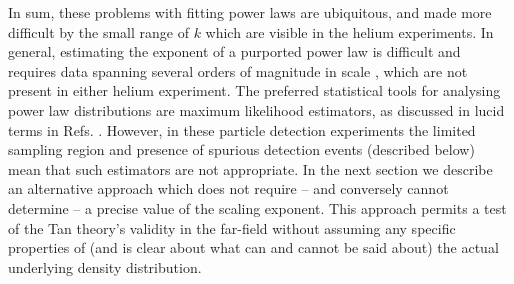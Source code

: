 	In sum, these problems with fitting power laws are ubiquitous, and made more difficult by the small range of $k$ which are visible in the helium experiments.
	In general, estimating the exponent of a purported power law is difficult and requires data spanning several orders of magnitude in scale \cite{Goldstein04,Clauset09,Virkar14,Hanel17}, which are not present in either  helium experiment.
	The preferred statistical tools for analysing power law distributions are maximum likelihood estimators, as discussed in lucid terms in Refs. \cite{Clauset09,Virkar14}.
	However, in these particle detection experiments the limited sampling region and presence of spurious detection events (described below) mean that such estimators are not appropriate.
	In the next section we describe an alternative approach which does not require -- and conversely cannot determine -- a precise value of the scaling exponent.
	This approach permits a test of the Tan theory's validity in the far-field without assuming any specific properties of (and is clear about what can and cannot be said about) the actual underlying density distribution.
	
